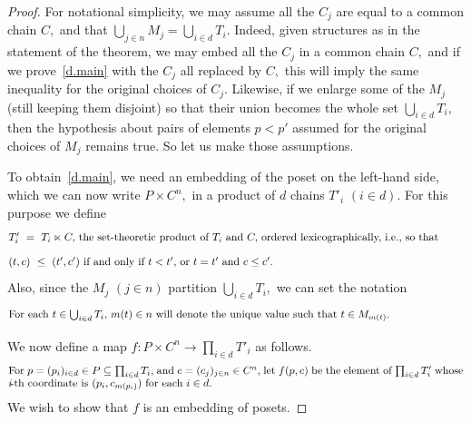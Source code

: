 \documentclass[10pt,a4paper]{amsart}
\begin{document}
\begin{proof}
For notational simplicity, we may assume all the $C_j$ are equal
to a common chain $C,$ and that
$\bigcup_{j\in n} M_j = \bigcup_{i\in d} T_i.$
Indeed, given structures as in the statement of the theorem,
we may embed all the $C_j$ in a common chain $C,$ and if we
prove~\eqref{d.main} with the $C_j$ all replaced by $C,$
this will imply the same inequality for the original
choices of $C_j.$
Likewise, if we enlarge some of the $M_j$
(still keeping them disjoint) so that their
union becomes the whole set $\bigcup_{i\in d} T_i,$
then the hypothesis about pairs of elements $p<p'$ assumed
for the original choices of $M_j$ remains true.
So let us make those assumptions.

To obtain~\eqref{d.main}, we need an embedding of the poset
on the left-hand side, which we can now write
$P\times C^n,$ in a product of $d$ chains $T'_i$ $(i\in d).$
For this purpose we define
%
\begin{equation}\begin{minipage}[c]{35pc}\label{d.T'}
$T'_i\ =\ T_i\ltimes C,$ the set-theoretic product
of $T_i$ and $C,$ ordered lexicographically, i.e., so that
\end{minipage}\end{equation}
%
\begin{equation}\begin{minipage}[c]{35pc}\label{d.lex}
$(t,c)\ \leq\ (t',c')$ if and only if
$t<t',$ or $t=t'$ and $c\leq c'.$
\end{minipage}\end{equation}
%
Also, since the $M_j$ $(j\in n)$ partition
$\bigcup_{i\in d} T_i,$ we can set the notation
%
\begin{equation}\begin{minipage}[c]{35pc}\label{d.mu}
For each $t\in\bigcup_{i\in d} T_i,$ $m(t)\in n$ will denote the
unique value such that $t\in M_{m(t)}.$
\end{minipage}\end{equation}

We now define a map $f: P\times C^n \to \prod_{i\in d} T'_i$ as follows.
%
\begin{equation}\begin{minipage}[c]{35pc}\label{d.f}
For $p=(p_i)_{i\in d}\in P \subseteq\prod_{i\in d} T_i,$
and $c=(c_j)_{j\in n}\in C^n,$ let
$f(p,c)$ be the element of $\prod_{i\in d} T'_i$ whose
$\!i\!$-th coordinate is $(p_i,c_{m(p_i)})$ for each $i\in d.$
\end{minipage}\end{equation}
%
We wish to show that $f$ is an embedding of posets.


\end{proof}
\end{document}
